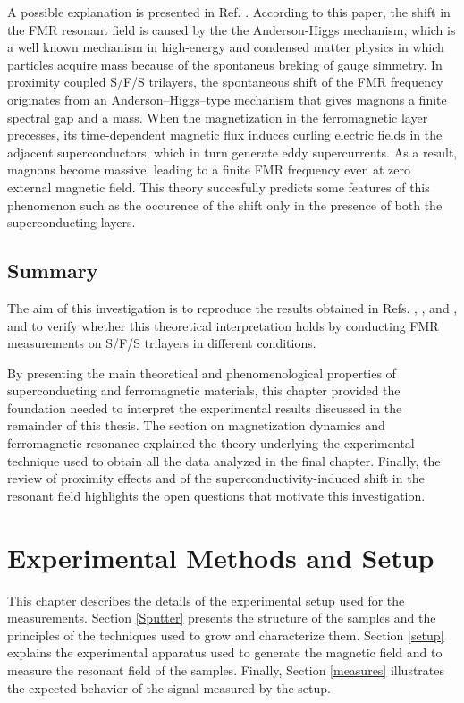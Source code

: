\documentclass[12pt,a4paper,oneside,openany]{book}
\begin{document}
A possible explanation is presented in Ref. \cite{Russian}. According to this paper, the shift in the FMR resonant field is caused by the the Anderson-Higgs mechanism, which is a well known mechanism in high-energy and condensed matter physics in which particles acquire mass because of the spontaneus breking of gauge simmetry. In proximity coupled S/F/S trilayers, the spontaneous shift of the FMR frequency originates from an Anderson–Higgs–type mechanism that gives magnons a finite spectral gap and a mass. When the magnetization in the ferromagnetic layer precesses, its time-dependent magnetic flux induces curling electric fields in the adjacent superconductors, which in turn generate eddy supercurrents. As a result, magnons become massive, leading to a finite FMR frequency even at zero external magnetic field. This theory succesfully predicts some features of this phenomenon such as the occurence of the shift only in the presence of both the superconducting layers. 

\section{Summary}
The aim of this investigation is to reproduce the results obtained in Refs. \cite{First_Evidence_1}, \cite{First_Evidence_2}, and \cite{Magnetization}, and to verify whether this theoretical interpretation holds by conducting FMR measurements on S/F/S trilayers in different conditions.

By presenting the main theoretical and phenomenological properties of superconducting and ferromagnetic materials, this chapter provided the foundation needed to interpret the experimental results discussed in the remainder of this thesis. The section on magnetization dynamics and ferromagnetic resonance explained the theory underlying the experimental technique used to obtain all the data analyzed in the final chapter. Finally, the review of proximity effects and of the superconductivity-induced shift in the resonant field highlights the open questions that motivate this investigation.

\chapter{Experimental Methods and Setup}
This chapter describes the details of the experimental setup used for the measurements. Section \ref{Sputter} presents the structure of the samples and the principles of the techniques used to grow and characterize them. Section \ref{setup} explains the experimental apparatus used to generate the magnetic field and to measure the resonant field of the samples. Finally, Section \ref{measures} illustrates the expected behavior of the signal measured by the setup.
\end{document}
